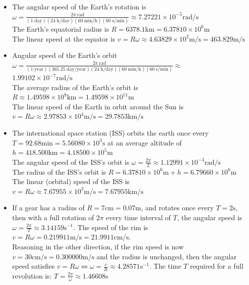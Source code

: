\documentclass{article}
\begin{document}
\begin{itemize}
\item The angular speed of the Earth's rotation is \(\omega = \frac{2\pi \; \text{rad}}{(1\;\text{day})(24\;\text{h/day})(60\;\text{min/h})(60\;\text{s/min})} \approx 7.27221 \times 10^{-5} \text{rad/s}\) \\
The Earth's equatorial radius is \(R = 6378.1\text{km} = 6.37810 \times 10^6 \text{m}\) \\
The linear speed at the equator is \(v = R\omega \approx 4.63829 \times 10^2 \text{m/s} = 463.829\text{m/s}\)
\item Angular speed of the Earth's orbit \(\omega = \frac{2\pi \; \text{rad}}{(1\;\text{year})(365.25\;\text{day/year})(24\;\text{h/day})(60\;\text{min/h})(60\;\text{s/min})} \approx \) \\ 
\(1.99102 \times 10^{-7} \text{rad/s}\) \\
The average radius of the Earth's orbit is \(R \approx 1.49598 \times 10^8\text{km} = 1.49598 \times 10^{11}\text{m}\) \\
The linear speed of the Earth in orbit around the Sun is \(v = R\omega \approx 2.97853 \times 10^4\text{m/s} = 29.7853\text{km/s}\)
\item The international space station (ISS) orbits the earth once every \(T = 92.68\text{min} = 5.56080 \times 10^3\text{s}\) at an average altitude of \(h = 418.500\text{km} = 4.18500 \times 10^5\text{m}\) \\
The angular speed of the ISS's orbit is \(\omega  = \frac{2\pi}{T} \approx 1.12991 \times 10^{-3} \text{rad/s}\) \\
The radius of the ISS's orbit is \(R = 6.37810 \times 10^6 \text{m} + h = 6.79660 \times 10^6 \text{m}\) \\
The linear (orbital) speed of the ISS is \(v = R\omega \approx 7.67955 \times 10^3\text{m/s} = 7.67955 \text{km/s}\)
\item If a gear has a radius of \(R = 7\text{cm} = 0.07\text{m}\), and rotates once every \(T = 2\text{s}\), then with a full rotation of \(2\pi\) every time interval of \(T\), the angular speed is \(\omega = \frac{2\pi}{T} \approx 3.14159 \text{s}^{-1}\). The speed of the rim is \(v = R\omega = 0.219911\text{m/s} = 21.9911\text{cm/s}\). \\
Reasoning in the other direction, if the rim speed is now \(v = 30\text{cm/s} = 0.300000 \text{m/s}\) and the radius is unchanged, then the angular speed satisfies \(v = R\omega \iff \omega = \frac{v}{R} \approx 4.28571 \text{s}^{-1}\). The time \(T\) required for a full revolution is: \(T = \frac{2\pi}{\omega} \approx 1.46608 \text{s}\)
\end{itemize}
\end{document}
